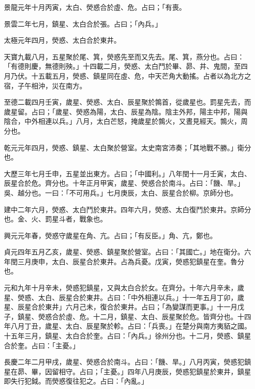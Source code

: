 \begin{pinyinscope}
 景龍元年十月丙寅，太白、熒惑合於虛、危。占曰；「有喪。



 景雲二年七月，鎮星、太白合於張。占曰；「內兵。」



 太極元年四月，熒惑、太白合於東井。



 天寶九載八月，五星聚於尾、箕，熒惑先至而又先去。尾、箕，燕分也。占曰：「有德則慶，無德則殃。」十四載二月，熒惑、太白鬥於畢、昴、井、鬼間，至四月乃伏。十五載五月，熒惑、鎮星同在虛、危，中天芒角大動搖。占者以為北方之宿，子午相沖，災在南方。



 至德二載四月壬寅，歲星、熒惑、太白、辰星聚於鶉首，從歲星也。罰星先去，而歲星留。占曰；「歲星、熒惑為陽，太白、辰星為陰。陰主外邦，陽主中邦，陽與陰合，中外相連以兵。」八月，太白芒怒，掩歲星於鶉火，又晝見經天。鶉火，周分也。



 乾元元年四月，熒惑、鎮星、太白聚於營室。太史南宮沛奏；「其地戰不勝。」衛分也。



 大歷三年七月壬申，五星並出東方。占曰；「中國利。」八年閏十一月壬寅，太白、辰星合於危。齊分也。十年正月甲寅，歲星、熒惑合於南斗。占曰：「饑、旱。」吳、越分也。一曰：「不可用兵。」七月庚辰，太白、辰星合於柳。京師分也。



 建中二年六月，熒惑、太白鬥於東井。四年六月，熒惑、太白復鬥於東井。京師分也。金、火、罰星斗者，戰象也。



 興元元年春，熒惑守歲星在角、亢。占曰；「有反臣。」角、亢，鄭也。



 貞元四年五月乙亥，歲星、熒惑、鎮星聚於營室。占曰：「其國亡。」地在衛分。六年閏三月庚申，太白、辰星合於東井。占為兵憂。戊寅，熒惑犯鎮星在奎。魯分也。



 元和九年十月辛未，熒惑犯鎮星，又與太白合於女。在齊分。十年六月辛未，歲星、熒惑、太白、辰星合於東井。占曰：「中外相連以兵。」十一年五月丁卯，歲星、辰星合於東井」六月己未，復合於東井。占曰；「為變謀而更事。」十一月戊子，鎮星、熒惑合於虛、危。十二月，鎮星、太白、辰星聚於危。皆齊分也。十四年八月丁丑，歲星、太白、辰星聚於軫。占曰：「兵喪。」在楚分與南方夷貊之國。十五年三月，鎮星、太白合於奎。占曰：「內兵。」徐州分也。十二月，熒惑、鎮星合於奎。占曰：「主憂。」



 長慶二年二月甲戌，歲星、熒惑合於南斗。占曰：「饑、旱。」八月丙寅，熒惑犯鎮星在昴、畢，因留相守。占曰；「主憂。」四年八月庚辰，熒惑犯鎮星於東井，鎮星即失行犯鉞。而熒惑復往犯之。占曰：「內亂。」




\end{pinyinscope}
